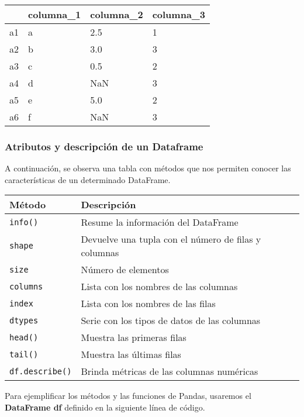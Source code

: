 \documentclass[
  letterpaper,
  DIV=11,
  numbers=noendperiod]{scrreprt}
\begin{document}
\begin{longtable}[]{@{}llll@{}}
\toprule\noalign{}
& columna\_1 & columna\_2 & columna\_3 \\
\midrule\noalign{}
\endhead
\bottomrule\noalign{}
\endlastfoot
a1 & a & 2.5 & 1 \\
a2 & b & 3.0 & 3 \\
a3 & c & 0.5 & 2 \\
a4 & d & NaN & 3 \\
a5 & e & 5.0 & 2 \\
a6 & f & NaN & 3 \\
\end{longtable}

\subsubsection{Atributos y descripción de un
Dataframe}\label{atributos-y-descripciuxf3n-de-un-dataframe}

A continuación, se observa una tabla con métodos que nos permiten
conocer las características de un determinado DataFrame.

\begin{longtable}[]{@{}ll@{}}
\toprule\noalign{}
Método & Descripción \\
\midrule\noalign{}
\endhead
\bottomrule\noalign{}
\endlastfoot
\texttt{info()} & Resume la información del DataFrame \\
\texttt{shape} & Devuelve una tupla con el número de filas y columnas \\
\texttt{size} & Número de elementos \\
\texttt{columns} & Lista con los nombres de las columnas \\
\texttt{index} & Lista con los nombres de las filas \\
\texttt{dtypes} & Serie con los tipos de datos de las columnas \\
\texttt{head()} & Muestra las primeras filas \\
\texttt{tail()} & Muestra las últimas filas \\
\texttt{df.describe()} & Brinda métricas de las columnas numéricas \\
\end{longtable}

Para ejemplificar los métodos y las funciones de Pandas, usaremos el
\textbf{DataFrame df} definido en la siguiente línea de código.
\end{document}
